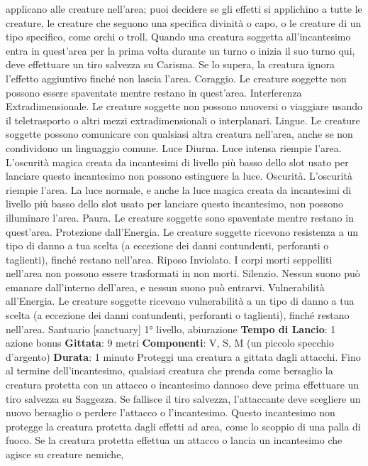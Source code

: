 \begin{multicols}{2}
applicano alle creature nell’area; puoi decidere se gli
effetti si applichino a tutte le creature, le creature che
seguono una specifica divinità o capo, o le creature di
un tipo specifico, come orchi o troll. Quando una
creatura soggetta all’incantesimo entra in quest’area
per la prima volta durante un turno o inizia il suo turno
qui, deve effettuare un tiro salvezza su Carisma. Se lo
supera, la creatura ignora l’effetto aggiuntivo finché non
lascia l’area.
Coraggio. Le creature soggette non possono essere
spaventate mentre restano in quest’area.
Interferenza Extradimensionale. Le creature soggette
non possono muoversi o viaggiare usando il
teletrasporto o altri mezzi extradimensionali o
interplanari.
Lingue. Le creature soggette possono comunicare con
qualsiasi altra creatura nell’area, anche se non
condividono un linguaggio comune.
Luce Diurna. Luce intensa riempie l’area. L’oscurità
magica creata da incantesimi di livello più basso dello
slot usato per lanciare questo incantesimo non possono
estinguere la luce.
Oscurità. L’oscurità riempie l’area. La luce normale, e
anche la luce magica creata da incantesimi di livello più
basso dello slot usato per lanciare questo incantesimo,
non possono illuminare l’area.
Paura. Le creature soggette sono spaventate mentre
restano in quest’area.
Protezione dall’Energia. Le creature soggette
ricevono resistenza a un tipo di danno a tua scelta (a
eccezione dei danni contundenti, perforanti o taglienti),
finché restano nell’area.
Riposo Inviolato. I corpi morti seppelliti nell’area non
possono essere trasformati in non morti.
Silenzio. Nessun suono può emanare dall’interno
dell’area, e nessun suono può entrarvi.
Vulnerabilità all’Energia. Le creature soggette
ricevono vulnerabilità a un tipo di danno a tua scelta (a
eccezione dei danni contundenti, perforanti o taglienti),
finché restano nell’area.
Santuario
[sanctuary]
1° livello, abiurazione
\textbf{Tempo di Lancio}: 1 azione bonus
\textbf{Gittata}: 9 metri
\textbf{Componenti}: V, S, M (un piccolo specchio d’argento)
\textbf{Durata}: 1 minuto
Proteggi una creatura a gittata dagli attacchi. Fino al
termine dell’incantesimo, qualsiasi creatura che prenda
come bersaglio la creatura protetta con un attacco o
incantesimo dannoso deve prima effettuare un tiro
salvezza su Saggezza. Se fallisce il tiro salvezza,
l’attaccante deve scegliere un nuovo bersaglio o
perdere l’attacco o l’incantesimo. Questo incantesimo
non protegge la creatura protetta dagli effetti ad area,
come lo scoppio di una palla di fuoco.
Se la creatura protetta effettua un attacco o lancia un
incantesimo che agisce su creature nemiche,

\end{multicols}
